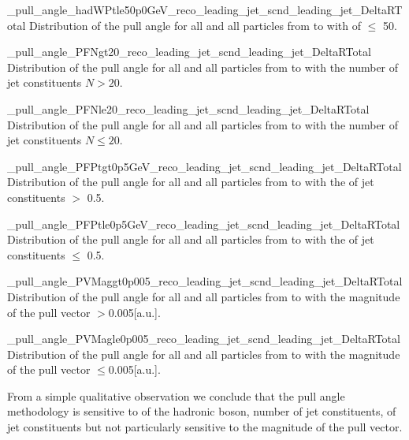      {_pull_angle_hadWPtle50p0GeV_reco_leading_jet_scnd_leading_jet_DeltaRTotal}
     {Distribution of the pull angle for all \DeltaR and all particles from \leadingjet to \scndleadingjet with \pt of \PW $\leq$ 50\GeV.}

     {_pull_angle_PFNgt20_reco_leading_jet_scnd_leading_jet_DeltaRTotal}
     {Distribution of the pull angle for all \DeltaR and all particles from \leadingjet to \scndleadingjet with the number of jet constituents $N>20$.}

     {_pull_angle_PFNle20_reco_leading_jet_scnd_leading_jet_DeltaRTotal}
     {Distribution of the pull angle for all \DeltaR and all particles from \leadingjet to \scndleadingjet with the number of jet constituents $N\leq20$.}

     {_pull_angle_PFPtgt0p5GeV_reco_leading_jet_scnd_leading_jet_DeltaRTotal}
     {Distribution of the pull angle for all \DeltaR and all particles from \leadingjet to \scndleadingjet with the \pt of jet constituents $>$ 0.5\GeV.}

     {_pull_angle_PFPtle0p5GeV_reco_leading_jet_scnd_leading_jet_DeltaRTotal}
     {Distribution of the pull angle for all \DeltaR and all particles from \leadingjet to \scndleadingjet with the \pt of jet constituents $\leq$ 0.5\GeV.}

     {_pull_angle_PVMaggt0p005_reco_leading_jet_scnd_leading_jet_DeltaRTotal}
     {Distribution of the pull angle for all \DeltaR and all particles from \leadingjet to \scndleadingjet with the magnitude of the pull vector $> $0.005[a.u.].}

    {_pull_angle_PVMagle0p005_reco_leading_jet_scnd_leading_jet_DeltaRTotal}
    {Distribution of the pull angle for all \DeltaR and all particles from \leadingjet to \scndleadingjet with the magnitude of the pull vector $\leq $0.005[a.u.].}

From a simple qualitative observation we conclude that the pull angle methodology is sensitive to \pt of the hadronic \PW boson, number of jet constituents, \pt of jet constituents but not particularly sensitive to the magnitude of the pull vector.



